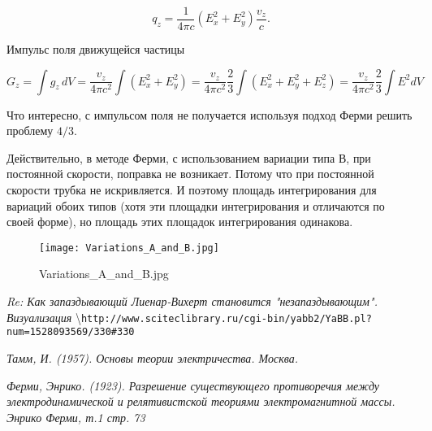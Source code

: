 \documentclass[11pt]{article}
\begin{document}
    \[{q_z} = \frac{1}{4 \pi c} \left(E_x^2 + E_y^2\right)\frac{v_z}{c}.\]

    Импульс поля движущейся частицы

\[G_z = \int g_z \, dV = \frac{v_z}{4 \pi c^2} \int \left(E_x^2 + E_y^2\right) = \frac{v_z}{4 \pi c^2} \frac{2}{3}\int \left(E_x^2 + E_y^2 + E_z^2\right) = \frac{v_z}{4 \pi c^2} \frac{2}{3}\int E^2 dV\]

    Что интересно, с импульсом поля не получается используя подход Ферми
решить проблему \(4/3\).

Действительно, в методе Ферми, с использованием вариации типа В, при
постоянной скорости, поправка не возникает. Потому что при постоянной
скорости трубка не искривляется. И поэтому площадь интегрирования для
вариаций обоих типов (хотя эти площадки интегрирования и отличаются по
своей форме), но площадь этих площадок интегрирования одинакова.

    \begin{figure}
\centering
\texttt{[image: Variations\_A\_and\_B.jpg]}
\caption{Variations_A_and_B.jpg}
\end{figure}


\begin{thebibliography}{99}


\textit{Re: Как запаздывающий Лиенар-Вихерт становится "незапаздывающим". Визуализация}
\textbackslash{}\texttt{http://www.sciteclibrary.ru/cgi-bin/yabb2/YaBB.pl?num=1528093569/330\#330}

\textit{Тамм, И. (1957). Основы теории электричества. Москва.}

\textit{Ферми, Энрико. (1923). Разрешение существующего противоречия между электродинамической и релятивистской теориями электромагнитной массы. Энрико Ферми, т.1 стр. 73}

\end{thebibliography}
   
    
    
\end{document}
